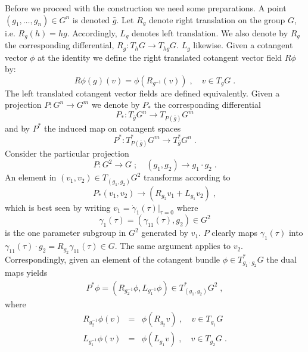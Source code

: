 \documentclass[12pt]{article}
\newcommand{\ba}{\begin{eqnarray}}
\newcommand{\ea}{\end{eqnarray}}
\newcommand{\nn}{\nonumber}
\def\t{\tau}
\begin{document}
Before we proceed with the construction we need some preparations. A point
 $(g_1,\ldots,g_n)\in G^n$ is denoted $\bar{g}$. Let $R_g$
 denote right translation on the group $G$, i.e. $R_g(h)=hg$. Accordingly,
 $L_g$ denotes left translation. We also denote by $R_g$ the corresponding
 differential, $R_g: T_hG\rightarrow T_{hg}G$. $L_g$ likewise. Given a cotangent vector $\phi$
 at the identity we define the right translated cotangent vector field $R\phi$
 by:
\[
R\phi(g)(v) = \phi(R_{g^{-1}}(v))\;,\quad v\in T_g G\;.
\]
The left translated cotangent vector fields are defined equivalently.
Given a projection $P:G^n\rightarrow G^{m}$ we denote by $P_\ast$ the
corresponding differential $$P_\ast: T_{\bar{g}}G^n\rightarrow
T_{P(\bar{g})}G^m $$ and by $P^\ast$ the induced map on cotangent spaces
$$P^\ast: T^\ast_{P(\bar{g})}G^m\rightarrow
T^\ast_{\bar{g}}G^n\;. $$
Consider the particular projection
\[
P: G^2\rightarrow G\;;\quad (g_1,g_2)\rightarrow g_1\cdot g_2\;.
\]
An element in $(v_1,v_2)\in T_{(g_1,g_2)}G^2$ transforms according to
\[
P_\ast (v_1,v_2)\rightarrow (R_{g_2}v_1+L_{g_1}v_2)\;,
\]
which is best seen by writing $v_1=\dot{\gamma}_1(\t)|_{\t=0}$ where $$\gamma_1(\t)=(\gamma_{11}(\t),g_2)\in G^2$$ is
the one parameter subgroup in $G^2$ generated by $v_1$. $P$ clearly maps
$\gamma_1(\t)$ into $\gamma_{11}(\t)\cdot g_2= R_{g_2}\gamma_{11}(\t)\in G$. The same
argument applies to $v_2$. Correspondingly, given an element of the cotangent
bundle $\phi\in T^\ast_{g_1\cdot g_2}G$ the dual maps yields
\ba
P^\ast \phi = (R_{g_2^{-1}}\phi,L_{g_1^{-1}}\phi)\in T^\ast_{(g_1,g_2)}G^2\;,
\label{cota}
\ea
where
\ba 
R_{g_2^{-1}}\phi(v)&=&\phi(R_{g_2}v)\;,\quad  v\in T_{g_1}G\nn\\
L_{g_1^{-1}}\phi(v)&=&\phi(L_{g_1}v)\;,\quad v\in T_{g_2}G\;.\nn
\ea
\end{document}
